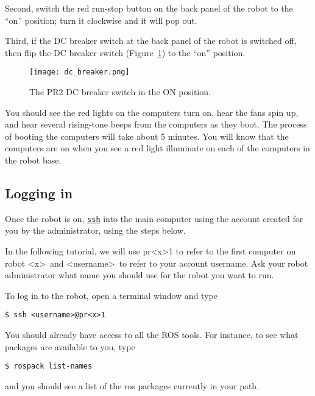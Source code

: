 Second, switch the red run-stop button on the back panel of the robot to the ``on'' position; turn it clockwise and it will pop out.

Third, if the DC breaker switch at the back panel of the robot is switched off, then flip the DC breaker switch (Figure~\ref{fig:dc_breaker}) to the ``on'' position.

\begin{figure}[h]
\centering
\texttt{[image: dc\_breaker.png]}
\caption{The PR2 DC breaker switch in the ON position.}
\label{fig:dc_breaker}
\end{figure}

You should see the red lights on the computers turn on, hear the fans spin up, and hear several rising-tone beeps from the computers 
as they boot.  The process of booting the computers will take about 5 minutes.  You will know that the computers are on when you see a red light illuminate on each of the computers in the robot base.  
\subsection{Logging in}
Once the robot is on, \texttt{\href{http://unixhelp.ed.ac.uk/CGI/man-cgi?ssh}{ssh}} into the main computer using the account 
created for you by the administrator, using the steps below.

In the following tutorial, we will use pr\textless x\textgreater 1 to refer to the first computer on robot \textless x\textgreater\ and \textless username\textgreater\ to refer to your account username.
Ask your robot  administrator what name you should use for the robot you want to run. 

To log in to the robot, open a terminal window and type
\begin{verbatim}
$ ssh <username>@pr<x>1
\end{verbatim}
You should already have access to all the ROS tools. For instance, to see what packages are available to you, type
\begin{verbatim}
$ rospack list-names
\end{verbatim}
and you should see a list of the ros packages currently in your path.

